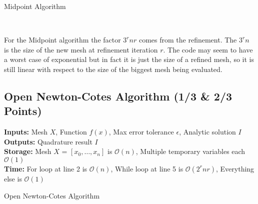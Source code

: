 \documentclass[12pt]{article}
\DeclarePairedDelimiter \abs{\lvert}{\rvert}%
\theoremstyle{remark}
\begin{document}
\begin{algorithm}[H]
	\caption{Midpoint Algorithm}
	\begin{algorithmic}[1]
		\EndFor
		\EndIf
		\EndFor
		\EndWhile
		 \\
	\end{algorithmic}
\end{algorithm}

For the Midpoint algorithm the factor $3^rnr$ comes from the refinement. The $3^rn$ is the size of the new mesh at refinement iteration $r$. The code may seem to have a worst case of exponential but in fact it is just the size of a refined mesh, so it is still linear with respect to the size of the biggest mesh being evaluated.

\newpage

\subsection{Open Newton-Cotes Algorithm (1/3 \& 2/3 Points)}

\textbf{Inputs:} Mesh $X$, Function $f(x)$, Max error tolerance $\epsilon$, Analytic solution $I$ \\
\textbf{Outputs:} Quadrature result $I$ \\
\textbf{Storage:} Mesh $X$ = $[x_0, \dots, x_n]$ is $\mathcal{O}(n)$, Multiple temporary variables each $\mathcal{O}(1)$ \\
\textbf{Time:} For loop at line 2 is $\mathcal{O}(n)$, While loop at line 5 is $\mathcal{O}(2^rnr)$, Everything else is $\mathcal{O}(1)$

\begin{algorithm}[H]
	\caption{Open Newton-Cotes Algorithm}
	\begin{algorithmic}[1]
		\EndFor
		\EndFor
		\EndWhile
		 \\
	\end{algorithmic}
\end{algorithm}
\end{document}
